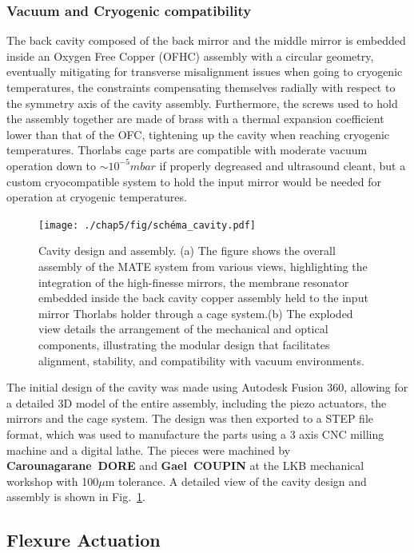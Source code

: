 \subsubsection{Vacuum and Cryogenic compatibility}
The back cavity composed of the back mirror and the middle mirror is embedded inside an Oxygen Free Copper (OFHC) assembly with a circular geometry, eventually mitigating for transverse misalignment issues when going to cryogenic temperatures, the constraints compensating themselves radially with respect to the symmetry axis of the cavity assembly\cite{OFHC_review}. Furthermore, the screws used to hold the assembly together are made of brass with a thermal expansion coefficient lower than that of the OFC, tightening up the cavity when reaching cryogenic temperatures.
Thorlabs cage parts are compatible with moderate vacuum operation down to $\sim 10^{-5} mbar$ if properly degreased and ultrasound cleant, but a custom cryocompatible system to hold the input mirror would be needed for operation at cryogenic temperatures. \\


\begin{figure}[H]
    \centering  
    \texttt{[image: ./chap5/fig/schéma\_cavity.pdf]}
    \caption{Cavity design and assembly. (a) The figure shows the overall assembly of the MATE system from various views, highlighting the integration of the high-finesse mirrors, the membrane resonator embedded inside the back cavity copper assembly held to the input mirror Thorlabs holder through a cage system.(b) The exploded view details the arrangement of the mechanical and optical components, illustrating the modular design that facilitates alignment, stability, and compatibility with vacuum environments.}
    \label{fig:cad_cavity}
\end{figure}


The initial design of the cavity was made using Autodesk Fusion 360, allowing for a detailed 3D model of the entire assembly, including the piezo actuators, the mirrors and the cage system. The design was then exported to a STEP file format, which was used to manufacture the parts using a 3 axis CNC milling machine and a digital lathe. The pieces were machined by \textbf{Carounagarane~DORE} and \textbf{Gael~COUPIN} at the LKB mechanical workshop with 100$\mu$m tolerance. A detailed view of the cavity design and assembly is shown in Fig.~\ref{fig:cad_cavity}.

\subsection{Flexure Actuation}

